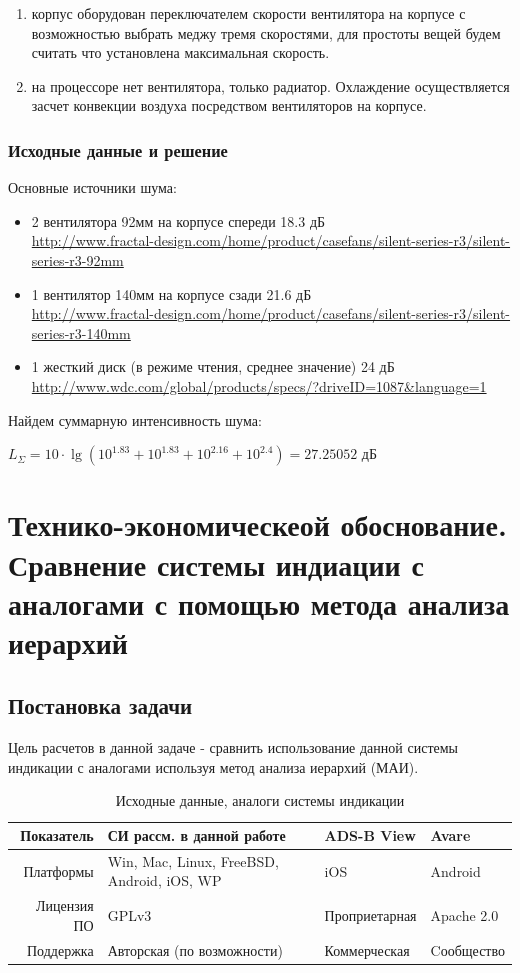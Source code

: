 \documentclass[a4paper,12pt]{report} %
\begin{document}
\begin{enumerate}
\item корпус оборудован переключателем скорости вентилятора
  на корпусе с возможностью выбрать меджу тремя скоростями, для простоты вещей
  будем считать что установлена максимальная скорость.
\item на процессоре нет вентилятора, только радиатор. Охлаждение осуществляется
  засчет конвекции воздуха посредством вентиляторов на корпусе.
\end{enumerate}

\subsection{Исходные данные и решение}
Основные источники шума:
\begin{itemize}
\item 2 вентилятора 92мм на корпусе спереди 18.3 дБ \\
  \url{http://www.fractal-design.com/home/product/casefans/silent-series-r3/silent-series-r3-92mm}
\item 1 вентилятор 140мм на корпусе сзади 21.6 дБ \\
  \url{http://www.fractal-design.com/home/product/casefans/silent-series-r3/silent-series-r3-140mm}
\item 1 жесткий диск (в режиме чтения, среднее значение) 24 дБ \\
  \url{http://www.wdc.com/global/products/specs/?driveID=1087&language=1}
\end{itemize}

Найдем суммарную интенсивность шума:

$L_\Sigma =  10 \cdot \lg (10^{1.83} + 10^{1.83} + 10^{2.16} + 10^{2.4}) =
27.25052$ дБ
\newpage
\chapter{Технико-экономическеой обоснование. Сравнение системы индиации с
  аналогами с помощью метода анализа иерархий} %
\section{Постановка задачи}
Цель расчетов в данной задаче - сравнить использование данной системы индикации
с аналогами используя метод анализа иерархий (МАИ).

\begin{table}[!ht]
  \caption{Исходные данные, аналоги системы индикации}
  \begin{tabular}{ | r | p{6cm} | l | l |}
    \hline
    Показатель   & СИ рассм. в данной работе                  & ADS-B View    & Avare  \\
    \hline
    Платформы    & Win, Mac, Linux, FreeBSD, Android, iOS, WP & iOS           & Android \\
    \hline
    Лицензия ПО  & GPLv3                                      & Проприетарная & Apache 2.0 \\
    \hline
    Поддержка    & Авторская (по возможности)                 & Коммерческая  & Cообщество \\
    \hline
  \end{tabular}
\end{table}
\end{document}
